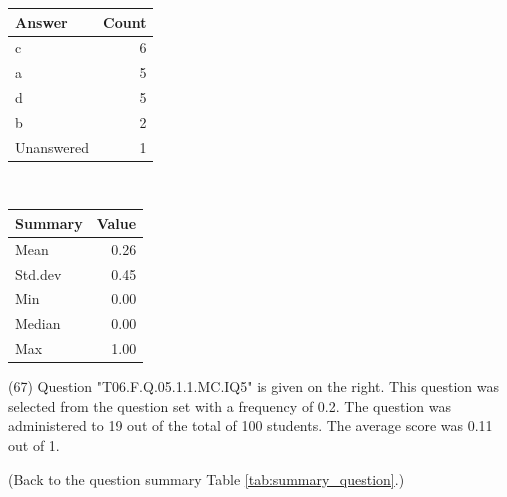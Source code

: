 \documentclass[12pt,nohyper]{tufte-handout}\usepackage[]{graphicx}\usepackage[]{color}
\begin{document}
\begin{center}%
\begin{tabular}{lr}
  \hline
Answer & Count \\ 
  \hline
c &   6 \\ 
  a &   5 \\ 
  d &   5 \\ 
  b &   2 \\ 
  Unanswered &   1 \\ 
   \hline
\end{tabular}
~~~~~~~~%
\begin{tabular}{lr}
  \hline
Summary & Value \\ 
  \hline
Mean & 0.26 \\ 
  Std.dev & 0.45 \\ 
  Min & 0.00 \\ 
  Median & 0.00 \\ 
  Max & 1.00 \\ 
   \hline
\end{tabular}
\end{center}\newpage{} (67) Question "T06.F.Q.05.1.1.MC.IQ5" is given on the right. This question was selected from the question set with a frequency of 0.2. The question was administered to 19 out of the total of 100 students. The average score was 0.11 out of 1.

 (Back to the question summary Table \ref{tab:summary_question}.)
\end{document}

